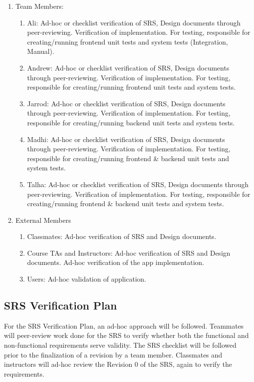 \documentclass[12pt, titlepage]{article}
\begin{document}
\begin{enumerate}
	\item Team Members:
	\begin{enumerate}
		\item Ali: Ad-hoc or checklist verification of SRS, Design documents through peer-reviewing. Verification of implementation. For testing, responsible for creating/running frontend unit tests and system tests (Integration, Manual).
		\item Andrew: Ad-hoc or checklist verification of SRS, Design documents through peer-reviewing. Verification of implementation. For testing, responsible for creating/running frontend unit tests and system tests.
		\item Jarrod: Ad-hoc or checklist verification of SRS, Design documents through peer-reviewing. Verification of implementation. For testing, responsible for creating/running backend unit tests and system tests.
		\item Madhi: Ad-hoc or checklist verification of SRS, Design documents through peer-reviewing. Verification of implementation. For testing, responsible for creating/running frontend \& backend unit tests and system tests.
		\item Talha: Ad-hoc or checklist verification of SRS, Design documents through peer-reviewing. Verification of implementation. For testing, responsible for creating/running frontend \& backend unit tests and system tests.
	\end{enumerate}
	\item External Members
	\begin{enumerate}
		\item Classmates: Ad-hoc verification of SRS and Design documents.
		\item Course TAs and Instructors: Ad-hoc verification of SRS and Design documents. Ad-hoc verification of the app implementation.
		\item Users: Ad-hoc validation of application. 
	\end{enumerate}
\end{enumerate}


\subsection{SRS Verification Plan}
For the SRS Verification Plan, an ad-hoc approach will be followed. Teammates will peer-review work done for the SRS to verify whether both the functional and non-functional requirements serve validity. The SRS checklist will be followed prior to the finalization of a revision by a team member. Classmates and instructors will ad-hoc review the Revision 0 of the SRS, again to verify the requirements. 
\end{document}
